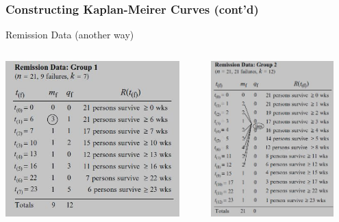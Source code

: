 \documentclass{beamer}
\theoremstyle{definition}
\begin{document}
\begin{frame}
\frametitle{Constructing Kaplan-Meirer Curves (cont'd)}
\begin{block}{Remission Data (another way)}
\begin{columns}
    \begin{column}{0.48\textwidth}
        \includegraphics[width =\textwidth, height=6cm]{Ch1-leuk_data_a1.JPG}
    \end{column}
    \hspace{-10pt}
    \begin{column}{0.48\textwidth}
         \includegraphics[width =\textwidth, height=6cm]{Ch1-leuk_data_b1.JPG}
    \end{column}
\end{columns}
\end{block}
\end{frame}
\end{document}

